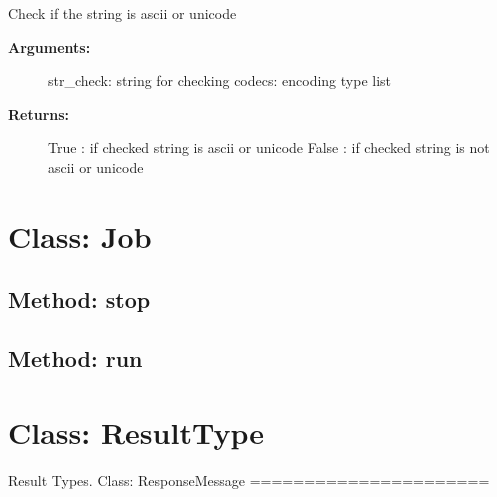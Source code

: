 Check if the string is ascii or unicode

\begin{description}
\item[\textbf{Arguments:}]
str\_check: string for checking codecs: encoding type list
\item[\textbf{Returns:}]
True : if checked string is ascii or unicode False : if checked string
is not ascii or unicode
\end{description}

\hypertarget{qconnectbase-utils-class-job-87}{%
\section{Class: Job}\label{qconnectbase-utils-class-job-87}}

\begin{Shaded}
\begin{Highlighting}[]
\end{Highlighting}
\end{Shaded}

\hypertarget{qconnectbase-utils-method-stop-88}{%
\subsection{Method: stop}\label{qconnectbase-utils-method-stop-88}}

\hypertarget{qconnectbase-utils-method-run-89}{%
\subsection{Method: run}\label{qconnectbase-utils-method-run-89}}

\hypertarget{qconnectbase-utils-class-resulttype-90}{%
\section{Class: ResultType}\label{qconnectbase-utils-class-resulttype-90}}

\begin{Shaded}
\begin{Highlighting}[]
\end{Highlighting}
\end{Shaded}

Result Types. Class: ResponseMessage ======================

\begin{Shaded}
\begin{Highlighting}[]
\end{Highlighting}
\end{Shaded}

